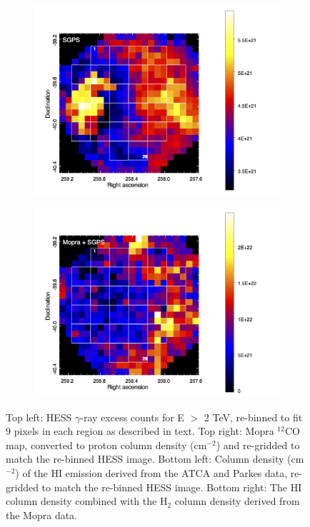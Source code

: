 \documentclass[12pt,a4paper]{article}
\begin{document}
\begin{figure}[H]
\begin{subfigure}{0.5\textwidth}
	\end{subfigure}
	\begin{subfigure}{0.5\textwidth}
		\centering
		\includegraphics[width=1.05\linewidth, height=0.25\textheight]{HI_9pixels}
	\end{subfigure}
	\begin{subfigure}{0.5\textwidth}
		\centering
		\includegraphics[width=1.05\linewidth, height=0.25\textheight]{mopra_HI_9pixels}
	\end{subfigure}
	\caption{Top left: HESS $\gamma$-ray excess counts for E $>$ 2 TeV, re-binned to fit 9 pixels in each region as described in text. Top right: Mopra $^{12}$CO map, converted to proton column density (cm$^{-2}$) and re-gridded to match the re-binned HESS image. Bottom left: Column density (cm$^{-2}$) of the HI emission derived from the ATCA and Parkes data, re-gridded to match the re-binned HESS image. Bottom right: The HI column density combined with the H$_2$ column density derived from the Mopra data.}
	\label{fig:moprahess9pixels}
\end{figure}
\end{document}
